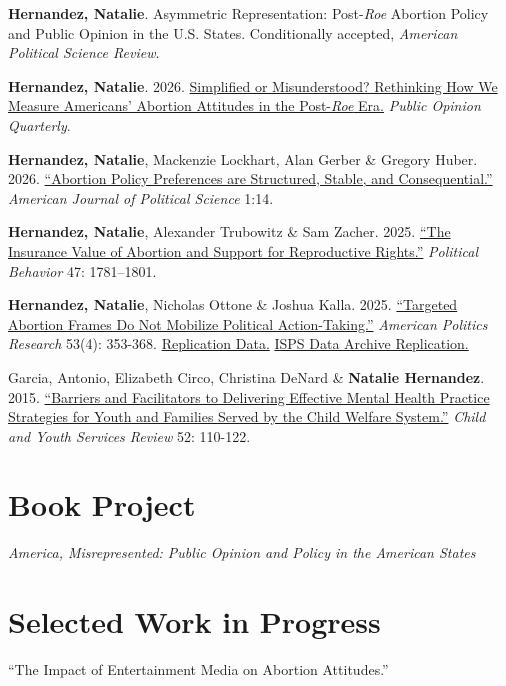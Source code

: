 \documentclass[11pt]{article}
\begin{document}
\begin{etaremune}
    \item \textbf{Hernandez, Natalie}. Asymmetric Representation: Post-\textit{Roe} Abortion Policy and Public Opinion in the U.S. States. Conditionally accepted, \textit{American Political Science Review}.
    \item \textbf{Hernandez, Natalie}. 2026. \href{https://doi.org/10.1093/poq/nfag050}{Simplified or Misunderstood? Rethinking How We Measure Americans’ Abortion Attitudes in the Post-\textit{Roe} Era.} \textit{Public Opinion Quarterly}.
    \item \textbf{Hernandez, Natalie}, Mackenzie Lockhart, Alan Gerber \& Gregory Huber. 2026. \href{https://doi.org/10.1111/ajps.70036}{“Abortion Policy Preferences are Structured, Stable, and Consequential.”} \emph{American Journal of Political Science} 1:14.
    \item \textbf{Hernandez, Natalie}, Alexander Trubowitz \& Sam Zacher. 2025. \href{https://link.springer.com/article/10.1007/s11109-025-10011-z}{“The Insurance Value of Abortion and Support for Reproductive Rights.”} \emph{Political Behavior} 47: 1781–1801.
    \item \textbf{Hernandez, Natalie}, Nicholas Ottone \& Joshua Kalla. 2025. \href{https://journals.sagepub.com/doi/10.1177/1532673X251324137}{“Targeted Abortion Frames Do Not Mobilize Political Action-Taking.”}  \emph{American Politics Research} 53(4): 353-368. \href{https://osf.io/j5vyd}{Replication Data.} \href{https://isps.yale.edu/research/data/d227}{ISPS Data Archive Replication.}
    \item Garcia, Antonio, Elizabeth Circo, Christina DeNard \& \textbf{Natalie Hernandez}. 2015. \href{https://www.sciencedirect.com/science/article/pii/S0190740915000912?casa_token=xJ4IZDv5iHsAAAAA:r0tMZY5rpMLRBqoEt6jjf_Qqm-ImXxOAOO4bwkLi4yIgtlvkInH18Sv3QWUjGK1K3sy4l7GASkk}{“Barriers and Facilitators to Delivering Effective Mental Health Practice Strategies for Youth and Families Served by the Child Welfare System.”} \emph{Child and Youth Services Review} 52: 110-122.
\end{etaremune}

\section*{Book Project}
\textit{America, Misrepresented: Public Opinion and Policy in the American States
}
\section*{Selected Work in Progress}
“The Impact of Entertainment Media on Abortion Attitudes.”
\end{document}
